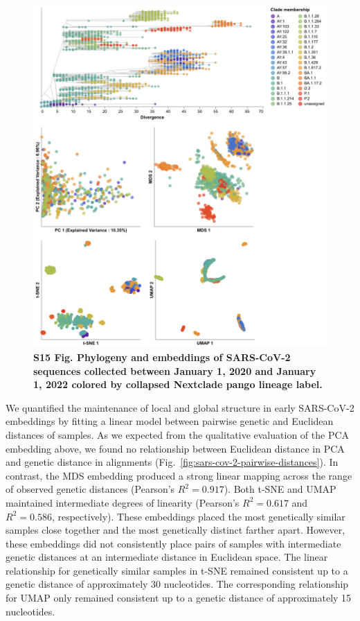 \documentclass[10pt,letterpaper]{article}
\begin{document}
\begin{figure}[!h]
\includegraphics[width=\columnwidth]{figures/sarscov2-embeddings-by-Nextclade_pango_collapsed-clade.png}
\caption*{{\bf S15 Fig. Phylogeny and embeddings of SARS-CoV-2 sequences collected between January 1, 2020 and January 1, 2022 colored by collapsed Nextclade pango lineage label.}}
\end{figure}

We quantified the maintenance of local and global structure in early SARS-CoV-2 embeddings by fitting a linear model between pairwise genetic and Euclidean distances of samples.
As we expected from the qualitative evaluation of the PCA embedding above, we found no relationship between Euclidean distance in PCA and genetic distance in alignments (Fig.~\ref{fig:sars-cov-2-pairwise-distances}).
In contrast, the MDS embedding produced a strong linear mapping across the range of observed genetic distances (Pearson's $R^{2}=0.917$).
Both t-SNE and UMAP maintained intermediate degrees of linearity (Pearson's $R^{2}=0.617$ and $R^{2}=0.586$, respectively).
These embeddings placed the most genetically similar samples close together and the most genetically distinct farther apart.
However, these embeddings did not consistently place pairs of samples with intermediate genetic distances at an intermediate distance in Euclidean space.
The linear relationship for genetically similar samples in t-SNE remained consistent up to a genetic distance of approximately 30 nucleotides.
The corresponding relationship for UMAP only remained consistent up to a genetic distance of approximately 15 nucleotides.
\end{document}
